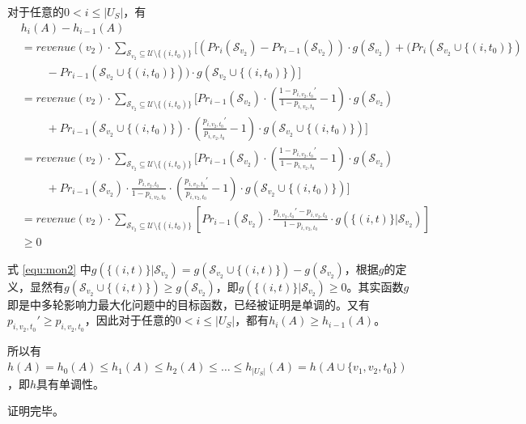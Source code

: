 对于任意的$0<i\le |U_S|$，有
\begin{align}
    &h_i(A)-h_{i-1}(A)\\
    &=revenue(v_2)\cdot \sum_{\mathcal{S}_{v_2}\subseteq \mathcal{U}\setminus \{(i,t_0)\}}[(Pr_i(\mathcal{S}_{v_2})-Pr_{i-1}(\mathcal{S}_{v_2}))\cdot g(\mathcal{S}_{v_2}) + (Pr_i(\mathcal{S}_{v_2}\cup \{(i,t_0)\}) \nonumber \\
    &\ \ \ \ \ \ \ \ \ \ -Pr_{i-1}(\mathcal{S}_{v_2}\cup \{(i,t_0)\}))\cdot g(\mathcal{S}_{v_2}\cup \{(i,t_0)\})] \\ 
    &=revenue(v_2)\cdot \sum_{\mathcal{S}_{v_2}\subseteq \mathcal{U}\setminus \{(i,t_0)\}}[Pr_{i-1}(\mathcal{S}_{v_2})\cdot\left(\frac{1-p_{i,v_2,t_0}'}{1-p_{i,v_2,t_0}}-1\right) \cdot g(\mathcal{S}_{v_2})  \nonumber \\ 
    &\ \ \ \ \ \ \ \ \ \ + Pr_{i-1}(\mathcal{S}_{v_2}\cup \{(i,t_0)\})\cdot (\frac{p_{i,v_2,t_0}'}{p_{i,v_2,t_0}}-1)\cdot g(\mathcal{S}_{v_2}\cup \{(i,t_0)\}) ]  \\ 
    &=revenue(v_2)\cdot \sum_{\mathcal{S}_{v_2}\subseteq \mathcal{U}\setminus \{(i,t_0)\}}[Pr_{i-1}(\mathcal{S}_{v_2})\cdot\left(\frac{1-p_{i,v_2,t_0}'}{1-p_{i,v_2,t_0}}-1\right) \cdot g(\mathcal{S}_{v_2}) \nonumber \\ 
    &\ \ \ \ \ \ \ \ \ \ + Pr_{i-1}(\mathcal{S}_{v_2})\cdot\frac{p_{i,v_2,t_0}}{1-p_{i,v_2,t_0}}\cdot (\frac{p_{i,v_2,t_0}'}{p_{i,v_2,t_0}}-1)\cdot g(\mathcal{S}_{v_2}\cup \{(i,t_0)\}) ] \\
    &=revenue(v_2)\cdot \sum_{\mathcal{S}_{v_2}\subseteq \mathcal{U}\setminus \{(i,t_0)\}}[Pr_{i-1}(\mathcal{S}_{v_2})\cdot\frac{p_{i,v_2,t_0}'-p_{i,v_2,t_0}}{1-p_{i,v_2,t_0}} \cdot g(\{(i,t)\} |\mathcal{S}_{v_2})] \label{equ:mon2} \\ 
    &\ge 0 
\end{align}

\noindent 式 \ref{equ:mon2} 中$g(\{(i,t)\} |\mathcal{S}_{v_2})=g(\mathcal{S}_{v_2}\cup\{(i,t)\})-g(\mathcal{S}_{v_2})$，根据$g$的定义，显然有$g(\mathcal{S}_{v_2}\cup\{(i,t)\})\ge g(\mathcal{S}_{v_2})$，即$g(\{(i,t)\} |\mathcal{S}_{v_2}) \ge 0$。其实函数$g$即是\parencite{mrim}中多轮影响力最大化问题中的目标函数，已经被证明是单调的。又有$p_{i,v_2,t_0}'\ge p_{i,v_2,t_0}$，因此对于任意的$0<i\le |U_S|$，都有$h_i(A) \ge h_{i-1}(A)$。

所以有$h(A)=h_0(A) \le h_1(A) \le h_2(A) \le \ldots \le h_{|U_S|}(A)=h(A \cup\{v_1,v_2,t_0\})$，即$h$具有单调性。

\noindent 证明完毕。

